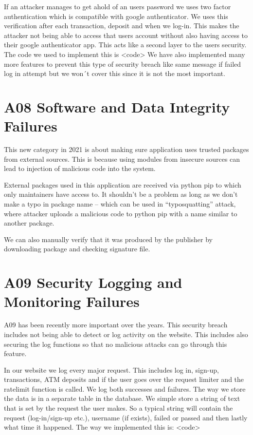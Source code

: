 If an attacker manages to get ahold of an users password we uses two factor authentication which is compatible with google authenticator. We uses this verification after each transaction, deposit and when we log-in. This makes the attacker not being able to access that users account without also having access to their google authenticator app. This acts like a second layer to the users security.  The code we used to implement this is <code>
We have also implemented many more features to prevent this type of security breach like same message if failed log in attempt but we won´t cover this since it is not the most important. 

\pagebreak
\section{A08 Software and Data Integrity Failures}

This new category in 2021 is about making sure application uses trusted packages from external sources. This is because using modules from insecure sources can lead to injection of malicious code into the system.

External packages used in this application are received via python pip to which only maintainers have access to. It shouldn’t be a problem as long as we don’t make a typo in package name – which can be used in “typosquatting” attack, where attacker uploads a malicious code to python pip with a name similar to another package.

We can also manually verify that it was produced by the publisher by downloading package and checking signature file.

\section{A09 Security Logging and Monitoring Failures}

A09 has been recently more important over the years. This security breach includes not being able to detect or log activity on the website. This includes also securing the log functions so that no malicious attacks can go through this feature. 

In our website we log every major request. This includes log in, sign-up, transactions, ATM deposits and if the user goes over the request limiter and the ratelimit function is called. We log both successes and failures. The way we store the data is in a separate table in the database. We simple store a string of text that is set by the request the user makes. So a typical string will contain the request (log-in/sign-up etc.), username (if exists), failed or passed and then lastly what time it happened. The way we implemented this is: <code>

